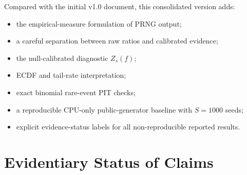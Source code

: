 \documentclass[11pt,a4paper]{article}
\begin{document}
Compared with the initial v1.0 document, this consolidated version adds:
\begin{itemize}
  \item the empirical-measure formulation of PRNG output;
  \item a careful separation between raw ratios and calibrated evidence;
  \item the null-calibrated diagnostic $Z_s(f)$;
  \item ECDF and tail-rate interpretation;
  \item exact binomial rare-event PIT checks;
  \item a reproducible CPU-only public-generator baseline with $S=1000$ seeds;
  \item explicit evidence-status labels for all non-reproducible reported results.
\end{itemize}

\section{Evidentiary Status of Claims}
\end{document}
